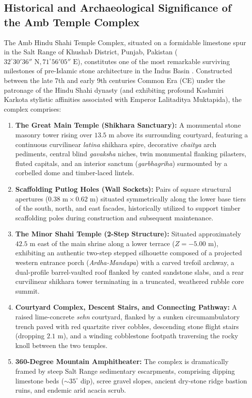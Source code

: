 \documentclass[11pt,a4paper]{article}
\begin{document}
\subsection{Historical and Archaeological Significance of the Amb Temple Complex}
The Amb Hindu Shahi Temple Complex, situated on a formidable limestone spur in the Salt Range of Khushab District, Punjab, Pakistan ($32^\circ 30' 36''\text{ N}, 71^\circ 56' 05''\text{ E}$), constitutes one of the most remarkable surviving milestones of pre-Islamic stone architecture in the Indus Basin \cite{meister1996temple, cunningham1875archaeological}. Constructed between the late 7th and early 9th centuries Common Era (CE) under the patronage of the Hindu Shahi dynasty (and exhibiting profound Kashmiri Karkota stylistic affinities associated with Emperor Lalitaditya Muktapida), the complex comprises:
\begin{enumerate}[label=(\alph*)]
    \item \textbf{The Great Main Temple (Shikhara Sanctuary):} A monumental stone masonry tower rising over $13.5\text{ m}$ above its surrounding courtyard, featuring a continuous curvilinear \textit{latina} shikhara spire, decorative \textit{chaitya} arch pediments, central blind \textit{gavaksha} niches, twin monumental flanking pilasters, fluted capitals, and an interior sanctum (\textit{garbhagriha}) surmounted by a corbelled dome and timber-laced lintels.
    \item \textbf{Scaffolding Putlog Holes (Wall Sockets):} Pairs of square structural apertures ($0.38\text{ m} \times 0.62\text{ m}$) situated symmetrically along the lower base tiers of the south, north, and east facades, historically utilized to support timber scaffolding poles during construction and subsequent maintenance.
    \item \textbf{The Minor Shahi Temple (2-Step Structure):} Situated approximately $42.5\text{ m}$ east of the main shrine along a lower terrace ($Z = -5.00\text{ m}$), exhibiting an authentic two-step stepped silhouette composed of a projected western entrance porch (\textit{Ardha-Mandapa}) with a carved trefoil archway, a dual-profile barrel-vaulted roof flanked by canted sandstone slabs, and a rear curvilinear shikhara tower terminating in a truncated, weathered rubble core summit.
    \item \textbf{Courtyard Complex, Descent Stairs, and Connecting Pathway:} A raised lime-concrete \textit{sehn} courtyard, flanked by a sunken circumambulatory trench paved with red quartzite river cobbles, descending stone flight stairs (dropping $2.1\text{ m}$), and a winding cobblestone footpath traversing the rocky knoll between the two temples.
    \item \textbf{360-Degree Mountain Amphitheater:} The complex is dramatically framed by steep Salt Range sedimentary escarpments, comprising dipping limestone beds ($\sim 35^\circ$ dip), scree gravel slopes, ancient dry-stone ridge bastion ruins, and endemic arid acacia scrub.
\end{enumerate}
\end{document}
